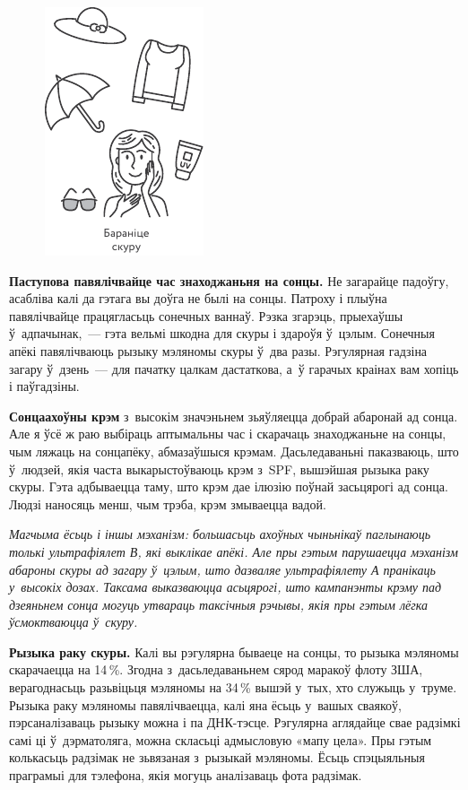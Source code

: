\begin{figure}[htb!]
  \centering
  \includegraphics[scale=1.5]{willpower/ch12/3.pdf}
\end{figure}

\textbf{Паступова павялічвайце час знаходжаньня на сонцы.} Не загарайце падоўгу, асабліва калі да гэтага вы доўга не былі на сонцы. Патроху і плыўна павялічвайце працягласьць сонечных ваннаў. Рэзка згарэць, прыехаўшы ў~адпачынак,~--- гэта вельмі шкодна для скуры і здароўя ў~цэлым. Сонечныя апёкі павялічваюць рызыку мэляномы скуры ў~два разы. Рэгулярная гадзіна загару ў~дзень~--- для пачатку цалкам дастаткова, а~ў гарачых краінах вам хопіць і паўгадзіны.

\textbf{Сонцаахоўны крэм} з~высокім значэньнем зьяўляецца добрай абаронай ад сонца. Але я ўсё ж раю выбіраць аптымальны час і скарачаць знаходжаньне на сонцы, чым ляжаць на сонцапёку, абмазаўшыся крэмам. Дасьледаваньні паказваюць, што ў~людзей, якія часта выкарыстоўваюць крэм з~SPF, вышэйшая рызыка раку скуры. Гэта адбываецца таму, што крэм дае ілюзію поўнай засьцярогі ад сонца. Людзі наносяць менш, чым трэба, крэм змываецца вадой.

\emph{Магчыма ёсьць і іншы мэханізм: большасьць ахоўных чыньнікаў паглынаюць толькі ультрафіялет В, які выклікае апёкі. Але пры гэтым парушаецца мэханізм абароны скуры ад загару ў~цэлым, што дазваляе ультрафіялету А пранікаць у~высокіх дозах. Таксама выказваюцца асьцярогі, што кампанэнты крэму пад дзеяньнем сонца могуць утвараць таксічныя рэчывы, якія пры гэтым лёгка ўсмоктваюцца ў~скуру.}

\textbf{Рызыка раку скуры.} Калі вы рэгулярна бываеце на сонцы, то рызыка мэляномы скарачаецца на 14\,\%. Згодна з~дасьледаваньнем сярод маракоў флоту ЗША, верагоднасьць разьвіцьця мэляномы на 34\,\% вышэй у~тых, хто служыць у~труме. Рызыка раку мэляномы павялічваецца, калі яна ёсьць у~вашых сваякоў, пэрсаналізаваць рызыку можна і па ДНК-тэсце. Рэгулярна аглядайце свае радзімкі самі ці ў~дэрматоляга, можна скласьці адмысловую «мапу цела». Пры гэтым колькасьць радзімак не зьвязаная з~рызыкай мэляномы. Ёсьць спэцыяльныя праграмыі для тэлефона, якія могуць аналізаваць фота радзімак.


